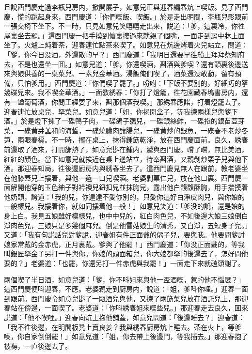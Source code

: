 且說西門慶走過李瓶兒房内，掀開簾子，如意兒正與迎春繡春炕上喫飯。見了西門慶，慌的跳起身來，西門慶道：「你們喫飯、喫飯。」於是走出明間，李瓶兒影跟前一張交椅下坐下。不一時，只見如意兒笑嘻嘻走出來，説道：「爹，這裏冷，你徃屋裏坐去罷。」這西門慶一把手摸到懷裏摟過來就親了個嘴，一面走到房中牀上面坐了。火爐上炖着茶，迎春連忙點茶來喫了。如意兒在炕邊烤着火兒站立，問道：「爹，你今日没酒，外邊散的早？」西門慶道：「我明日還要早徃船上拜拜蔡知府去，不是也還坐一囬。」如意兒道：「爹，你還喫酒，斟酒與爹喫？還有頭裏後邊送來與娘供養的一桌菜兒、一素兒金華酒。湯飯俺們喫了，酒菜還没敢動，留有預備，只怕爹用。」西門慶道：「你們喫了罷了。」吩咐：「下飯不要別的，好細巧的拏幾碟兒來。我不喫金華酒。」一面敎綉春：「你打了燈籠，徃花園藏春塢書房内，還有一罈葡萄酒，你問王經要了來，斟那個酒我喫。」那綉春應諾，打着燈籠去了。迎春連忙放桌兒，拏菜兒。如意兒道：「姐，你揭開盒子，等我揀兩樣兒與爹下酒。」於是燈下揀了一碟鴨子肉，一碟鴿子鶵兒，一碟銀絲鮓，一碟掐的銀苗荳芽菜，一碟黄芽韮和的海蜇，一碟燒臟肉釀腸兒，一碟黄炒的銀魚，一碟春不老炒冬笋，兩眼春槅。不一時，擺在桌上，抹得鍾筯乾淨，放在西門慶面前。良久，綉春前邊取了酒來，打開篩熱了，如意兒斟在鍾内，遞與西門慶。嚐了嚐，無比美酒，紅紅的顔色。當下如意兒就挨近在桌上邊站立，待奉斟酒，又親剝炒栗子兒與他下酒。那迎春知局，徃後邊廚房内與綉春坐去了。這西門慶見無人在跟前，教老婆坐在他膝蓋兒上摟着，與他一遞一口兒喫酒。老婆剝菓仁兒，放在他口裏。西門慶一面解開他穿的玉色紬子對衿襖兒鈕扣兒並抹胸兒，露出他白馥馥酥胸，用手揣摸着他奶頭，誇道：「我的兒，你達達不愛你別的，只愛你這好白淨皮肉兒，與你娘的一般樣兒。我摟着你，就如同摟着他一般！」如意兒笑道：「爹没的說，還是娘的身上白。我見五娘雖好模樣兒，也中中兒的，紅白肉色兒，不如後邊大娘三娘倒白淨肉色兒，三娘只是多幾個麻兒。倒是他雪姑娘生的清秀，又白淨，五短身子兒。」又道：「我有句説話兒對爹說，迎春姐有件正面戴的僊子兒，要與我。他要問爹討娘家常戴的金赤虎，正月裏戴。爹與了他罷！」西門慶道：「你没正面戴的，等我叫銀匠拏金子另打一件與你。你娘的頭面箱兒，你大娘都拏的後邊去了，怎好問他要的？」老婆道：「也罷，你還另打一件赤虎與我罷！」一面走下來就磕頭謝了。

兩個喫了半日酒，如意兒道：「爹，你不呌姐來與他一盃酒喫，惹的他不惱麽？」這西門慶便呌迎春，不應。老婆親走到廚房内，說道：「姐，爹呌你哩。」迎春一面到跟前。西門慶令如意兒斟了一甌酒兒與他，又揀了兩筯菜兒放在酒託兒上，那迎春站在傍邊，一面喫了。老婆道：「你呌綉春姐來喫些兒。」那迎春走去良久，囬來説道：「他不喫哩。」迎春向炕上抱他舖蓋，如意兒問道：「後邊睡去？」迎春道：「我不徃後邊，在明間板凳上賣良姜？我與綉春廚房炕上睡去。茶在火上，等爹喫，你自家倒倒罷！」如意兒道：「姐，你去帶上後邊門，等我插去。」那迎春抱了被褥，一直後邊去了。


